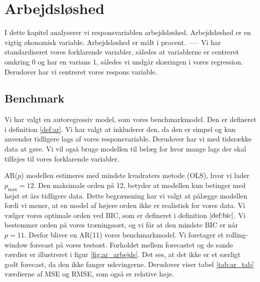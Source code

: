 \chapter{Arbejdsløshed}
I dette kapitel analyserer vi responsvariablen arbejdsløshed. 
Arbejdsløshed er en vigtig økonomisk variable. 
Arbejdsløshed er målt i procent. 
-----
Vi har standardiseret vores forklarende variabler, således at variablerne er centreret omkring 0 og har en varians 1, således vi undgår skæringen i vores regression.
Derudover har vi centreret vores respons variable. 
\section{Benchmark}
Vi har valgt en autoregressiv model, som vores benchmarkmodel. 
Den er defineret i  definition \ref{def:ar}.  
Vi har valgt at inkluderer den, da den er simpel og kun anvender tidligere lags af vores responsvariable. 
Derudover har vi med tidsrække data at gøre. 
Vi vil også bruge modellen til belæg for hvor mange lags der skal tilføjes til vores forklarende variabler. 

AR($p$) modellen estimeres med mindste kvadraters metode (OLS), hvor vi lader $p_{\text{max}} = 12$. 
Den maksimale orden på 12, betyder at modellen kun betinger med højst et års tidligere data. 
Dette begrænsning har vi valgt at pålægge modellen fordi vi mener, at en model af højere orden ikke er realistisk for vores data. 
Vi vælger vores optimale orden ved BIC, som er defineret i definition $\ref{def:bic}$.
Vi bestemmer orden på vores træningssæt, og vi får at den mindste BIC er når $p=11$.
Derfor bliver en AR(11) vores benchmarkmodel. 
Vi foretager et rolling-window forecast på vores testsæt.
Forholdet mellem forecastet og de sande værdier er illustreret i figur \ref{fig:ar_arbejds}. 
Det ses, at det ikke er et særligt godt forecast, da den ikke fanger udsvingerne. 
Derudover viser tabel \ref{tab:ar_tab} værdierne af MSE og RMSE, som også er relative høje. 



 
